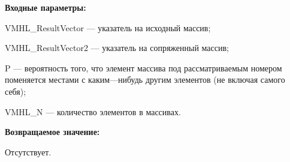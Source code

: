 \textbf{Входные параметры:}
 
VMHL\_ResultVector --- указатель на исходный массив;
 
VMHL\_ResultVector2 --- указатель на сопряженный массив;
 
P --- вероятность того, что элемент массива под рассматриваемым номером поменяется местами с каким---нибудь другим элементов (не включая самого себя);
 
VMHL\_N --- количество элементов в массивах.

\textbf{Возвращаемое значение:}

Отсутствует.